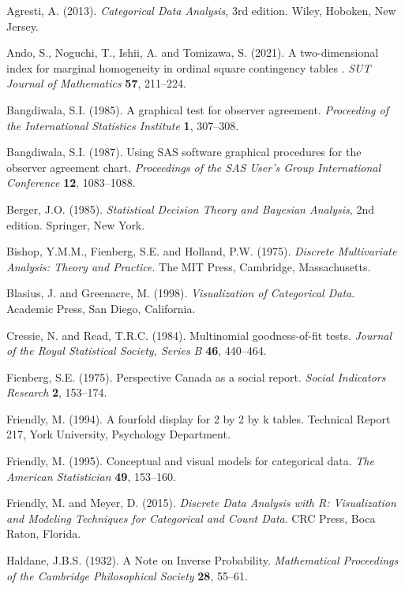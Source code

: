 \documentclass[a4j,12pt]{article}
\begin{document}
\newpage
\begin{thebibliography}{99}
\item[]	Agresti, A. (2013). \textit{Categorical Data Analysis}, 3rd edition. Wiley, Hoboken, New Jersey.
\item[]	Ando, S., Noguchi, T., Ishii, A. and Tomizawa, S. (2021). A two-dimensional index for marginal homogeneity in ordinal square contingency tables . \textit{SUT Journal of Mathematics} \textbf{57}, 211--224.
\item[]	Bangdiwala, S.I. (1985). A graphical test for observer agreement. \textit{Proceeding of the International Statistics Institute} \textbf{1}, 307--308.
\item[]	Bangdiwala, S.I. (1987). Using SAS software graphical procedures for the observer agreement chart. \textit{Proceedings of the SAS User’s Group International Conference} \textbf{12}, 1083--1088.
\item[]	Berger, J.O. (1985). \textit{Statistical Decision Theory and Bayesian Analysis}, 2nd edition. Springer, New York.
\item[]	Bishop, Y.M.M., Fienberg, S.E. and Holland, P.W. (1975). \textit{Discrete Multivariate Analysis: Theory and Practice}. The MIT Press, Cambridge, Massachusetts.
\item[]	Blasius, J. and Greenacre, M. (1998). \textit{Visualization of Categorical Data}. Academic Press, San Diego, California.
\item[]	Cressie, N. and Read, T.R.C. (1984). Multinomial goodness-of-fit tests. \textit{Journal of the Royal Statistical Society, Series B} \textbf{46}, 440--464.
\item[]	Fienberg, S.E. (1975). Perspective Canada as a social report. \textit{Social Indicators Research} \textbf{2}, 153--174.
\item[]	Friendly, M. (1994). A fourfold display for 2 by 2 by k tables. Technical Report 217, York University, Psychology Department. 
\item[]	Friendly, M. (1995). Conceptual and visual models for categorical data. \textit{The American Statistician} \textbf{49}, 153--160.
\item[]	Friendly, M. and Meyer, D. (2015). \textit{Discrete Data Analysis with R: Visualization and Modeling Techniques for Categorical and Count Data}. CRC Press, Boca Raton, Florida.
\item[]	Haldane, J.B.S. (1932). A Note on Inverse Probability. \textit{Mathematical Proceedings of the Cambridge Philosophical Society} \textbf{28}, 55--61.

\end{thebibliography}
\end{document}
